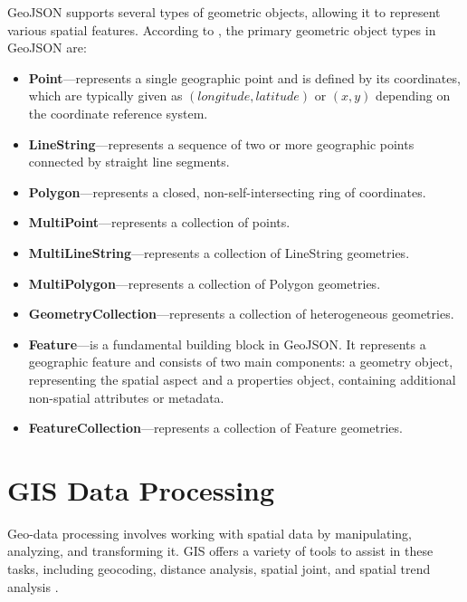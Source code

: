 GeoJSON supports several types of geometric objects, allowing it to represent various spatial features. According to \cite{butler2016geojson}, the primary geometric object types in GeoJSON are:

\begin{itemize}
    \item \textbf{Point}---represents a single geographic point and is defined by its coordinates, which are typically given as $(longitude, latitude)$ or $(x, y)$ depending on the coordinate reference system.
    \item \textbf{LineString}---represents a sequence of two or more geographic points connected by straight line segments.
    \item \textbf{Polygon}---represents a closed, non-self-intersecting ring of coordinates.
    \item \textbf{MultiPoint}---represents a collection of points.
    \item \textbf{MultiLineString}---represents a collection of LineString geometries.
    \item \textbf{MultiPolygon}---represents a collection of Polygon geometries.
    \item \textbf{GeometryCollection}---represents a collection of heterogeneous geometries.
    \item \textbf{Feature}---is a fundamental building block in GeoJSON. It represents a geographic feature and consists of two main components: a geometry object, representing the spatial aspect and a properties object, containing additional non-spatial attributes or metadata.
    \item \textbf{FeatureCollection}---represents a collection of Feature geometries.
\end{itemize}

\section{GIS Data Processing}

Geo-data processing involves working with spatial data by manipulating, analyzing, and transforming it. GIS offers a variety of tools to assist in these tasks, including geocoding, distance analysis, spatial joint, and spatial trend analysis \cite{gis2018tools}.

